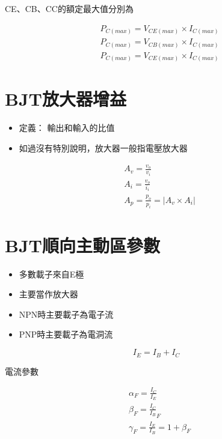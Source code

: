 \documentclass[
]{report}
\providecommand{\tightlist}{%
  \setlength{\itemsep}{0pt}\setlength{\parskip}{0pt}}
\begin{document}
CE、CB、CC的額定最大值分別為

\begin{equation*}
\begin{split}
& P_{C(max)} = V_{CE(max)} \times I_{C(max)} \\
& P_{C(max)} = V_{CB(max)} \times I_{C(max)} \\
& P_{C(max)} = V_{CE(max)} \times I_{C(max)}
\end{split}
\end{equation*}

\hypertarget{bjtux653eux5927ux5668ux589eux76ca}{%
\section{BJT放大器增益}\label{bjtux653eux5927ux5668ux589eux76ca}}

\begin{itemize}
\tightlist
\item
  定義： 輸出和輸入的比值
\item
  如過沒有特別說明，放大器一般指電壓放大器
\end{itemize}

\begin{equation*}
\begin{split}
& A_v = \frac{v_o}{v_i} \\
& A_i = \frac{v_o}{i_i} \\
& A_p = \frac{p_o}{p_i} = | A_v \times A_i |
\end{split}
\end{equation*}

\hypertarget{bjtux9806ux5411ux4e3bux52d5ux5340ux53c3ux6578}{%
\section{BJT順向主動區參數}\label{bjtux9806ux5411ux4e3bux52d5ux5340ux53c3ux6578}}

\begin{itemize}
\tightlist
\item
  多數載子來自E極
\item
  主要當作放大器
\item
  NPN時主要載子為電子流
\item
  PNP時主要載子為電洞流
\end{itemize}

\[
I_E = I_B + I_C
\]

電流參數

\begin{equation*}
\begin{split}
& {\alpha}_F = \frac{I_C}{I_E} \\
& {\beta}_F = \frac{I_C}{I_B}_F  \\
& {\gamma}_F = \frac{I_E}{ I_B} = 1 + β_F 
\end{split}
\end{equation*}
\end{document}
